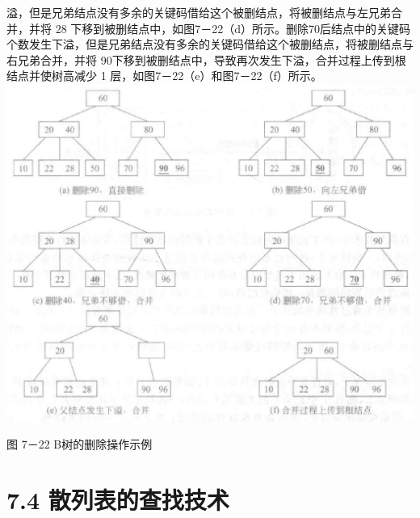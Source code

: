 \documentclass[10pt]{article}
\begin{document}
溢，但是兄弟结点没有多余的关键码借给这个被删结点，将被删结点与左兄弟合并，并将 28 下移到被删结点中，如图7－22（d）所示。删除70后结点中的关键码个数发生下溢，但是兄弟结点没有多余的关键码借给这个被删结点，将被删结点与右兄弟合并，并将 90下移到被删结点中，导致再次发生下溢，合并过程上传到根结点并使树高减少 1 层，如图7－22（e）和图7－22（f）所示。\\
\includegraphics[max width=\textwidth, center]{2025_06_06_704745ea57b15b2333e5g-252(1)}

图 7－22 B树的删除操作示例

\section*{7.4 散列表的查找技术}
\end{document}
